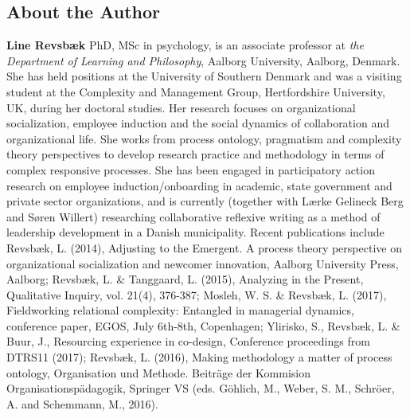     \fadebreak{}
\subsection{About the Author}
\label{paper3:colophon}

\textbf{Line Revsbæk} PhD, MSc in psychology, is an associate professor at \textit{the Department of Learning and Philosophy}, Aalborg University, Aalborg, Denmark. She has held positions at the University of Southern Denmark and was a visiting student at the Complexity and Management Group, Hertfordshire University, UK, during her doctoral studies. Her research focuses on organizational socialization, employee induction and the social dynamics of collaboration and organizational life. She works from process ontology, pragmatism and complexity theory perspectives to develop research practice and methodology in terms of complex responsive processes. She has been engaged in participatory action research on employee induction/onboarding in academic, state government and private sector organizations, and is currently (together with Lærke Gelineck Berg and Søren Willert) researching collaborative reflexive writing as a method of leadership development in a Danish municipality. Recent publications include Revsbæk, L. (2014), Adjusting to the Emergent. A process theory perspective on organizational socialization and newcomer innovation, Aalborg University Press, Aalborg; Revsbæk, L. \& Tanggaard, L. (2015), Analyzing in the Present, Qualitative Inquiry, vol. 21(4), 376-387; Mosleh, W. S. \& Revsbæk, L. (2017), Fieldworking relational complexity: Entangled in managerial dynamics, conference paper, EGOS, July 6th-8th, Copenhagen; Ylirisko, S., Revsbæk, L. \& Buur, J., Resourcing experience in co-design, Conference proceedings from DTRS11 (2017); Revsbæk, L. (2016), Making methodology a matter of process ontology, Organisation und Methode. Beiträge der Kommision Organisationspädagogik, Springer VS (eds. Göhlich, M., Weber, S. M., Schröer, A. and Schemmann, M., 2016).      